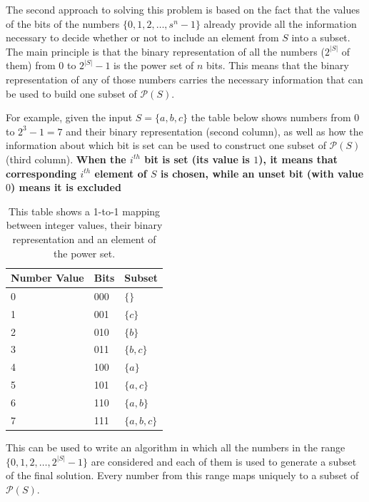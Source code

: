 The second approach to solving this problem is based on the fact that the values of the
bits of the numbers $\{0,1,2,\ldots, s^n-1\}$  already provide all the information necessary to decide whether or not to include an element from $S$ into a subset. 
The main principle is that the binary representation of all the numbers ($2^{|S|}$ of them) from $0$ to $2^{|S|}-1$ is the power set of $n$ bits.
This means that the binary representation of any of those numbers carries the necessary information that can be used to build one subset of $\mathcal{P}(S)$. 


For example, given the input $S=\{a,b,c\}$ the table below shows numbers from $0$ to $2^3-1 = 7$ and their binary
representation (second column), as well as how the information about which bit is set can be used to construct one subset of $\mathcal{P}(S)$ (third column).
\textbf{When the $i^{th}$ bit is set (its value is $1$), it means that
corresponding $i^{th}$ element of $S$ is chosen, while an unset bit (with value $0$) means it is
excluded}

\begin{table}
    \centering
    \begin{tabular}{|l|l|l|}
        \hline
        Number Value & Bits & Subset\\ \hline
        0     & 000  & $\{\}$\\ \hline
        1     & 001  & $\{c\}$\\ \hline
        2     & 010  & $\{b\}$\\ \hline
        3     & 011  & $\{b,c\}$\\ \hline
        4     & 100  & $\{a\}$\\ \hline
        5     & 101  & $\{a,c\}$\\ \hline
        6     & 110  & $\{a,b\}$\\ \hline
        7     & 111  & $\{a,b,c\}$ \\ \hline
    \end{tabular}
    \caption[Mapping between bits and element of the power set.]{This table shows a 1-to-1 mapping between integer values, their binary representation and an element of the power set.}
    \label{tab:mapping_value_bits}
\end{table}


This can be used to write an algorithm in which all the numbers in the range $\{0,1,2,\ldots,
2^{|S|}-1\}$ are considered and each of them is used to generate a subset of the final solution.
Every number from this range maps uniquely to a subset of $\mathcal{P}(S)$. 

